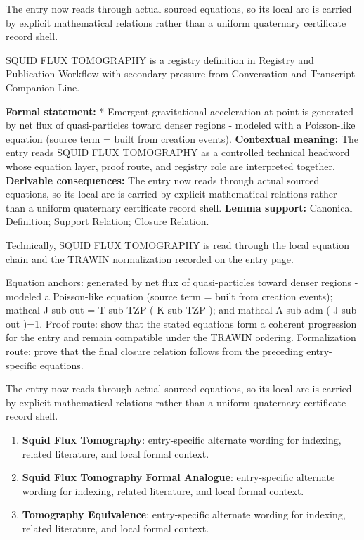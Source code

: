 The entry now reads through actual sourced equations, so its local arc is carried by explicit mathematical relations rather than a uniform quaternary certificate record shell.
\clearpage


\begingroup\small
{}
SQUID FLUX TOMOGRAPHY is a registry definition in Registry and Publication Workflow with secondary pressure from Conversation and Transcript Companion Line.

\begingroup\footnotesize\setlength{\emergencystretch}{3em}\sloppy
\textbf{Formal statement:} * Emergent gravitational acceleration at point is generated by net flux of quasi-particles toward denser regions - modeled with a Poisson-like equation (source term = built from creation events). \textbf{Contextual meaning:} The entry reads SQUID FLUX TOMOGRAPHY as a controlled technical headword whose equation layer, proof route, and registry role are interpreted together. \textbf{Derivable consequences:} The entry now reads through actual sourced equations, so its local arc is carried by explicit mathematical relations rather than a uniform quaternary certificate record shell. \textbf{Lemma support:} Canonical Definition; Support Relation; Closure Relation.\par
\endgroup

Technically, SQUID FLUX TOMOGRAPHY is read through the local equation chain and the TRAWIN normalization recorded on the entry page.

Equation anchors: generated by net flux of quasi-particles toward denser regions - modeled a Poisson-like equation (source term = built from creation events); mathcal J sub out = T sub TZP ( K sub TZP ); and mathcal A sub adm ( J sub out )=1. Proof route: show that the stated equations form a coherent progression for the entry and remain compatible under the TRAWIN ordering. Formalization route: prove that the final closure relation follows from the preceding entry-specific equations.

The entry now reads through actual sourced equations, so its local arc is carried by explicit mathematical relations rather than a uniform quaternary certificate record shell.
\endgroup

\begin{enumerate}[leftmargin=1.6em,itemsep=6pt,topsep=4pt]
\item \textbf{Squid Flux Tomography}: entry-specific alternate wording for indexing, related literature, and local formal context.
\item \textbf{Squid Flux Tomography Formal Analogue}: entry-specific alternate wording for indexing, related literature, and local formal context.
\item \textbf{Tomography Equivalence}: entry-specific alternate wording for indexing, related literature, and local formal context.
\end{enumerate}

